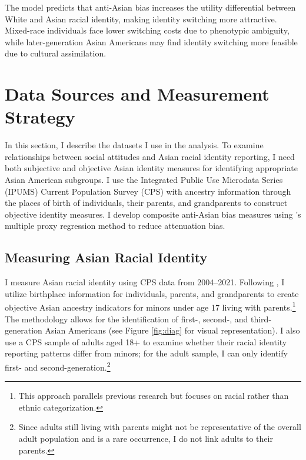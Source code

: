 The model predicts that anti-Asian bias increases the utility differential between White and Asian racial identity, making identity switching more attractive. Mixed-race individuals face lower switching costs due to phenotypic ambiguity, while later-generation Asian Americans may find identity switching more feasible due to cultural assimilation.

\section{Data Sources and Measurement Strategy}\label{sec:data}

In this section, I describe the datasets I use in the analysis. To examine relationships between social attitudes and Asian racial identity reporting, I need both subjective and objective Asian identity measures for identifying appropriate Asian American subgroups. I use the Integrated Public Use Microdata Series (IPUMS) Current Population Survey (CPS) \autocite{floodsarahIntegratedPublicUse2021a} with ancestry information through the places of birth of individuals, their parents, and grandparents to construct objective identity measures. I develop composite anti-Asian bias measures using \textcite{lubotskyInterpretationRegressionsMultiple2006}'s multiple proxy regression method to reduce attenuation bias.

\subsection{Measuring Asian Racial Identity}\label{subsec:cps}

I measure Asian racial identity using CPS data from 2004--2021. Following \textcite{antmanEthnicAttritionObserved2016,antmanEthnicAttritionAssimilation2020}, I utilize birthplace information for individuals, parents, and grandparents to create objective Asian ancestry indicators for minors under age 17 living with parents.\footnote{This approach parallels previous research but focuses on racial rather than ethnic categorization.} The methodology allows for the identification of first-, second-, and third-generation Asian Americans (see Figure \ref{fig:diag} for visual representation). I also use a CPS sample of adults aged 18+ to examine whether their racial identity reporting patterns differ from minors; for the adult sample, I can only identify first- and second-generation.\footnote{Since adults still living with parents might not be representative of the overall adult population and is a rare occurrence, I do not link adults to their parents.}

